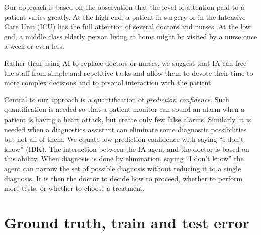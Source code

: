 \documentclass[11pt]{pnas-new}
\begin{document}
Our approach is based on the observation that the level of attention
paid to a patient varies greatly. At the high end, a patient in
surgery or in the Intensive Care Unit (ICU) has the full attention of
several doctors and nurses. At the low end, a middle class elderly
person living at home might be visited by a nurse once a week or even less.

Rather than using AI to replace doctors or nurses, we suggest that IA can free
the staff from simple and repetitive tasks and allow them to devote
their time to more complex decisions and to prsonal interaction with
the patient.

Central to our approach is a quantification of {\em prediction confidence}. Such
quantification is needed so that a patient monitor can sound an alarm
when a patient is having a heart attack, but create only few false
alarms. Similarly, it is needed when a diagnostics assistant can
eliminate some diagnostic possibilities but not all of them.
We equate low prediction confidence with saying ``I don't know'' (IDK). The
interaction between the IA agent and the doctor is based on this
ability. When diagnosis is done by elimination, saying ``I don't
know'' the agent can narrow the set of possible diagnosis without
reducing it to a single diagnosis. It is then the doctor to decide how
to proceed, whether to perform more tests, or whether to choose a treatment.


\section{Ground truth, train and test error}
\label{sec:ground-truth}
\end{document}
